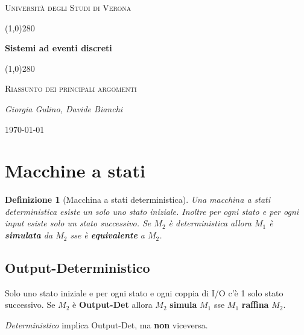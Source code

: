 \documentclass[a4paper]{article}
\date{\today}
\newtheorem{definit}{Definizione}[subsection]
\begin{document}
 \clearpage
 \begin{titlepage}
 	\centering
 	\vspace*{\fill}
 	{\scshape\LARGE Università degli Studi di Verona \par}
 	\vspace{1.5cm}
 	\line(1,0){280} \\
 	{\huge\bfseries Sistemi ad eventi discreti\par}
 	\line(1,0){280} \\
 	\vspace{0.5cm}
 	{\scshape\Large Riassunto dei principali argomenti\par}
 	\vspace{2cm}
 	{\Large\itshape Giorgia Gulino, Davide Bianchi\par}
 	\vspace{1cm}

 	\vspace{5cm}
 	\vspace*{\fill}
 	{\large \today\par}
 \end{titlepage}
 \thispagestyle{empty}
\newpage
\tableofcontents
\newpage

\section{Macchine a stati}

\begin{definit}[Macchina a stati deterministica]
Una macchina a stati deterministica esiste un solo uno stato iniziale. Inoltre per ogni stato e per ogni input esiste solo un stato successivo. Se $M_2$ è deterministica allora $M_1$ è \textbf{simulata} da $M_2$ sse è \textbf{equivalente} a $M_2$.
\end{definit}

\subsection{Output-Deterministico}
Solo uno stato iniziale e per ogni stato e ogni coppia di I/O c'è 1 solo stato successivo. Se $M_2$ è \textbf{Output-Det} allora $M_2$ \textbf{simula} $M_1$ sse $M_1$ \textbf{raffina} $M_2$.\\

\begin{center}
\emph{Deterministico} implica Output-Det, ma \textbf{non} viceversa.
\end{center}
\end{document}

